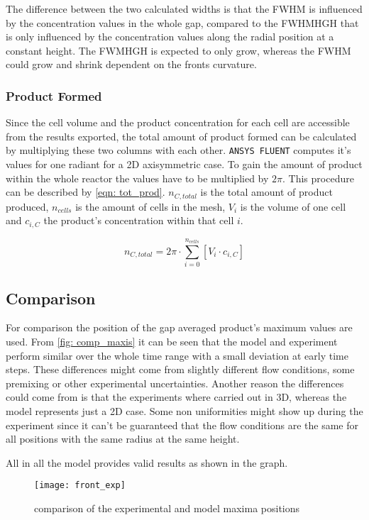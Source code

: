 \documentclass[../thesis.tex]{subfiles}
\begin{document}
The difference between the two calculated widths is that the FWHM is influenced by the concentration values in the whole gap, compared to the FWHMHGH that is only influenced by the concentration values along the radial position at a constant height. The FWMHGH is expected to only grow, whereas the FWHM could grow and shrink dependent on the fronts curvature.

\subsubsection{Product Formed}

Since the cell volume and the product concentration for each cell are accessible from the results exported, the total amount of product formed can be calculated by multiplying these two columns with each other. \texttt{ANSYS FLUENT} computes it's values for one radiant for a 2D axisymmetric case. To gain the amount of product within the whole reactor the values have to be multiplied by $2 \pi$. This procedure can be described by \autoref{eqn: tot_prod}. $ n_{C, total} $ is the total amount of product produced, $n_{cells}$ is the amount of cells in the mesh, $ V_i $ is the volume of one cell and $c_{i, C}$ the product's concentration within that cell $i$.

\begin{equation}
	n_{C, total} = 2 \pi \cdot \sum_{i=0}^{n_{cells}} \left[ V_i \cdot c_{i, C} \right]
	\label{eqn: tot_prod} 
\end{equation}

\subsection{Comparison}

For comparison the position of the gap averaged product's maximum values are used. From \autoref{fig: comp_maxis} it can be seen that the model and experiment perform similar over the whole time range with a small deviation at early time steps. These differences might come from slightly different flow conditions, some premixing or other experimental uncertainties. Another reason the differences could come from is that the experiments where carried out in 3D, whereas the model represents just a 2D case. Some non uniformities might show up during the experiment since it can't be guaranteed that the flow conditions are the same for all positions with the same radius at the same height.

All in all the model provides valid results as shown in the graph.
\begin{figure}[htbp]
	\centering
	\texttt{[image: front\_exp]}
	\caption{comparison of the experimental and model maxima positions}
	\label{fig: comp_maxis}
\end{figure}
\end{document}
